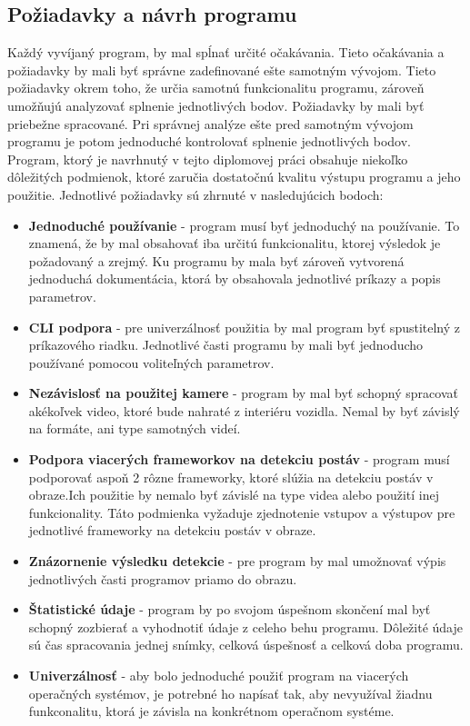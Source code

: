 \documentclass[slovak,master,dept460,male,cpp,cpdeclaration]{diploma}
\begin{document}
\subsection{Požiadavky a návrh programu}
Každý vyvíjaný program, by mal  spĺnať určité očakávania. Tieto očakávania a požiadavky by mali byť správne zadefinované ešte samotným vývojom. Tieto požiadavky okrem toho, že určia samotnú funkcionalitu programu, zároveň umožňujú analyzovať splnenie jednotlivých bodov. Požiadavky by mali byť priebežne spracované. Pri správnej analýze ešte pred samotným vývojom programu je potom jednoduché kontrolovať splnenie jednotlivých bodov. Program, ktorý je navrhnutý v tejto diplomovej práci obsahuje niekoľko dôležitých podmienok, ktoré zaručia dostatočnú kvalitu výstupu programu a jeho použitie. Jednotlivé požiadavky sú zhrnuté v nasledujúcich bodoch:
\begin{itemize}
\item \textbf{Jednoduché používanie} - program  musí byť jednoduchý na používanie. To znamená, že by mal obsahovať  iba určitú funkcionalitu, ktorej výsledok je požadovaný a zrejmý. Ku programu by mala byť zároveň vytvorená jednoduchá dokumentácia, ktorá by obsahovala jednotlivé príkazy a popis parametrov.

\item \textbf{CLI podpora} - pre univerzálnosť použitia by mal program byť spustitelný z príkazového riadku. Jednotlivé časti programu by mali byť jednoducho používané pomocou voliteľných parametrov.

\item \textbf{Nezávislosť na použitej kamere} - program by  mal byť schopný spracovať  akékoľvek video, ktoré bude nahraté z interiéru vozidla. Nemal by byť závislý na formáte, ani type samotných videí.

\item \textbf{Podpora  viacerých frameworkov na detekciu postáv} - program musí podporovať aspoň 2 rôzne frameworky, ktoré slúžia na detekciu postáv v obraze.Ich  použitie by nemalo byť závislé na type videa alebo použití inej funkcionality. Táto podmienka vyžaduje zjednotenie vstupov a výstupov pre jednotlivé frameworky na detekciu postáv v obraze.
\item \textbf{Znázornenie výsledku detekcie} - pre program by mal umožnovať výpis jednotlivých časti programov priamo do obrazu.
\item \textbf{Štatistické údaje} - program by po svojom úspešnom skončení mal byť schopný  zozbierať a vyhodnotiť údaje z celeho behu programu. Dôležité údaje sú čas spracovania jednej snímky, celková úspešnosť a celková doba programu. 
\item \textbf{Univerzálnosť} -  aby bolo jednoduché použiť program na viacerých operačných systémov, je potrebné ho napísať tak, aby  nevyužíval žiadnu funkconalitu, ktorá je závisla na konkrétnom operačnom systéme. 
\end{itemize}
\end{document}
